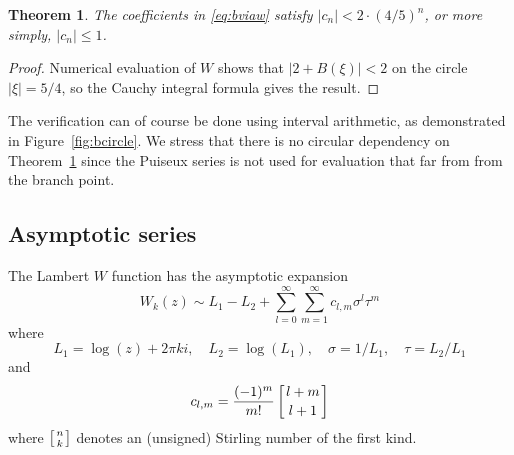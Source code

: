\documentclass[11pt,a4paper]{article}
\newtheorem{theorem}{Theorem}
\begin{document}
\begin{theorem}
\label{thm:puiseuxbound}
The coefficients in \eqref{eq:bviaw} satisfy $|c_n| < 2 \cdot (4/5)^n$, or more simply, $|c_n| \le 1$.
\end{theorem}

\begin{proof}
Numerical evaluation of $W$
shows that $|2+B(\xi)| < 2$ on the circle $|\xi| = 5/4$, so the Cauchy integral formula gives the result.
\end{proof}

The verification can of course be done using interval
arithmetic, as demonstrated in Figure~\ref{fig:bcircle}.
We stress that there is no circular dependency on Theorem~\ref{thm:puiseuxbound}
since the Puiseux series
is not used for evaluation that far from from the branch point.




% 

\subsection{Asymptotic series}

The Lambert $W$ function has the asymptotic expansion
\begin{equation}
\label{eq:asymp}
W_k(z) \sim L_1 - L_2 + \sum_{l=0}^{\infty} \sum_{m=1}^{\infty} c_{l,m} \sigma^l \tau^m
\end{equation}
where
\begin{equation}
L_1 = \log(z) + 2\pi k i, \quad L_2 = \log(L_1), \quad \sigma = 1/L_1, \quad \tau = L_2 / L_1
\end{equation}
and
\begin{equation}
c_{l,m} = \frac{(-1)^m}{m!} \left[{l+m \atop l+1}\right]
\end{equation}
where $\left[{n \atop k}\right]$ denotes an (unsigned) Stirling number
of the first kind.
\end{document}
